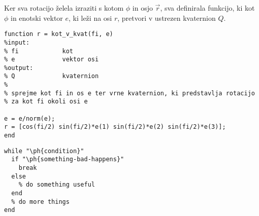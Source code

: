 \documentclass[12pt,a4paper,twoside]{article}
\let\ph\mlplaceholder %
\theoremstyle{definition} %
\theoremstyle{plain} %
\numberwithin{equation}{section}  %
\begin{document}
\noindent Ker sva rotacijo želela izraziti s kotom $\phi$ in osjo $\vec{r}$, sva definirala funkcijo, ki kot $\phi$ in enotski vektor $e$, ki leži na osi $r$, pretvori v ustrezen kvaternion $Q$.

\begin{lstlisting}[caption = {For educational purposes}]
function r = kot_v_kvat(fi, e)
%input:
% fi            kot
% e             vektor osi
%output:
% Q             kvaternion
%
% sprejme kot fi in os e ter vrne kvaternion, ki predstavlja rotacijo 
% za kot fi okoli osi e

e = e/norm(e);
r = [cos(fi/2) sin(fi/2)*e(1) sin(fi/2)*e(2) sin(fi/2)*e(3)];
end
\end{lstlisting}









\begin{lstlisting}[caption = {For educational purposes}]
% example of while loop using placeholders
while "\ph{condition}"
  if "\ph{something-bad-happens}"
    break
  else
    % do something useful
  end
  % do more things
end
\end{lstlisting}
\end{document}
